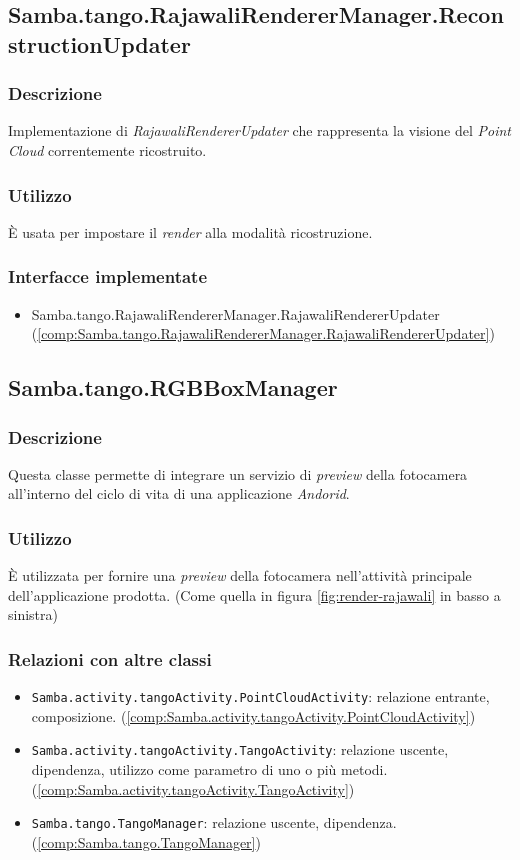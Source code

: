 \subsection{Samba.tango.RajawaliRendererManager.ReconstructionUpdater}\label{comp:Samba.tango.RajawaliRendererManager.ReconstructionUpdater}
\subsubsection{Descrizione}
Implementazione di \emph{RajawaliRendererUpdater} che rappresenta la visione del \emph{Point Cloud} correntemente ricostruito.
\subsubsection{Utilizzo}
È usata per impostare il \emph{render} alla modalità ricostruzione.
\subsubsection{Interfacce implementate}
\begin{itemize}
	\item Samba.tango.RajawaliRendererManager.RajawaliRendererUpdater (\ref{comp:Samba.tango.RajawaliRendererManager.RajawaliRendererUpdater})
\end{itemize}

\subsection{Samba.tango.RGBBoxManager}\label{comp:Samba.tango.RGBBoxManager}
\subsubsection{Descrizione}
Questa classe permette di integrare un servizio di \emph{preview} della fotocamera all'interno del ciclo di vita di una applicazione \emph{Andorid}.
\subsubsection{Utilizzo}
È utilizzata per fornire una \emph{preview} della fotocamera nell'attività principale dell'applicazione prodotta. (Come quella in figura \ref{fig:render-rajawali} in basso a sinistra)
\subsubsection{Relazioni con altre classi}
\begin{itemize}
	\item \texttt{Samba.activity.tangoActivity.PointCloudActivity}: relazione entrante, composizione. (\ref{comp:Samba.activity.tangoActivity.PointCloudActivity})
	\item \texttt{Samba.activity.tangoActivity.TangoActivity}: relazione uscente, dipendenza, utilizzo come parametro di uno o più metodi. (\ref{comp:Samba.activity.tangoActivity.TangoActivity})
	\item \texttt{Samba.tango.TangoManager}: relazione uscente, dipendenza. (\ref{comp:Samba.tango.TangoManager})
\end{itemize}


